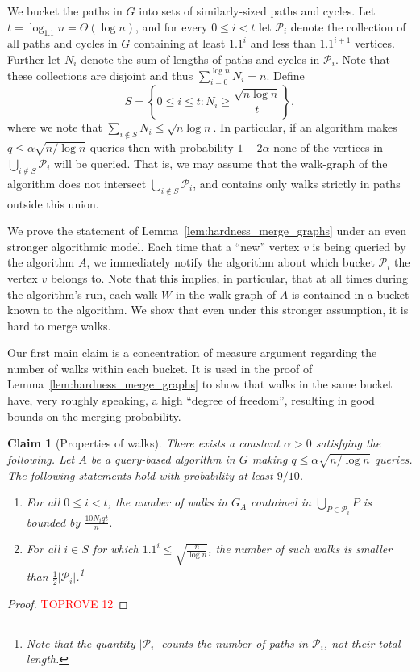 \documentclass[11pt]{article}
\numberwithin{equation}{section}
\newtheorem{claim}[claim]{Claim}
\renewcommand{\P}{\mathcal{P}}
\newcommand{\1}{\mathbf{1}}
\begin{document}
We bucket the paths in $G$ into sets of similarly-sized paths and cycles. Let $t = \log_{1.1} n = \Theta(\log n)$, 
and for every $0 \leq i < t$ let $\mathcal{P}_i$ denote the collection of all paths and cycles in $G$ containing at least $1.1^i$ and less than $1.1^{i+1}$ vertices.
Further let $N_i$ denote the sum of lengths of paths and cycles in $\mathcal{P}_i$. Note that these collections are disjoint and thus $\sum_{i=0}^{\log n} N_i = n.$ Define
$$
S = \left\{ 0 \leq i \leq t : N_i \geq \frac{\sqrt{n \log n}}{t}  \right\},
$$
where we note that $\sum_{i \notin S} N_i \leq \sqrt{n \log n}$. In particular, if an algorithm makes $q \leq \alpha \sqrt{n / \log n}$ queries then with probability $1-2\alpha$ none of the vertices in $\bigcup_{i \notin S} \mathcal{P}_i$ will be queried. That is, we may assume that the walk-graph of the algorithm does not intersect $\bigcup_{i \notin S} \P_i$, and contains only walks strictly in paths outside this union.

We prove the statement of Lemma~\ref{lem:hardness_merge_graphs} under an even stronger algorithmic model. Each time that a ``new'' vertex $v$ is being queried by the algorithm $A$, we immediately notify the algorithm about which bucket $\P_i$ the vertex $v$ belongs to. Note that this implies, in particular, that at all times during the algorithm's run, each walk $W$ in the walk-graph of $A$ is contained in a bucket known to the algorithm. We show that even under this stronger assumption, it is hard to merge walks.

Our first main claim is a concentration of measure argument regarding the number of walks within each bucket. It is used in the proof of Lemma~\ref{lem:hardness_merge_graphs} to show that walks in the same bucket have, very roughly speaking, a high ``degree of freedom'', resulting in good bounds on the merging probability.


\begin{claim}[Properties of walks]
\label{claim:walk_properties}
There exists a constant $\alpha > 0$ satisfying the following. Let $A$ be a query-based algorithm in $G$ making $q \leq \alpha \sqrt{n / \log{n}}$ queries. The following statements hold with probability at least $9/10$.
\begin{enumerate}
\item For all $0 \leq i < t$, the number of walks in $G_A$ contained in $\bigcup_{P \in \P_i} P$ is bounded by $\frac{10 N_i q t}{n}$.
\item For all $i \in S$ for which $1.1^i \leq \sqrt{\frac{n}{\log n}}$, the number of such walks is smaller than $\frac{1}{2} |\P_i|$.\footnote{Note that the quantity $|\P_i|$ counts the \emph{number} of paths in $\P_i$, not their total length.} 
\end{enumerate}
\end{claim}
\begin{proof}\textcolor{red}{TOPROVE 12}\end{proof}
\end{document}
